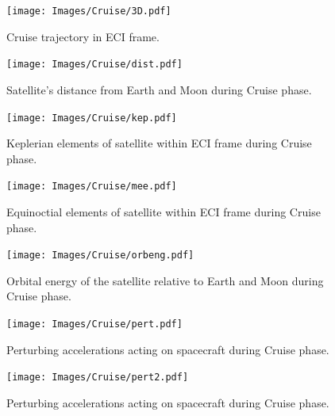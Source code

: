 \begin{figure}
\begin{center}
\texttt{[image: Images/Cruise/3D.pdf]}
\end{center}
\caption{Cruise trajectory in ECI frame.}
\label{fig:Cruise-3D}
\end{figure}

\begin{figure}
\begin{center}
\texttt{[image: Images/Cruise/dist.pdf]}
\end{center}
\caption{Satellite's distance from Earth and Moon during Cruise phase.}
\label{fig:Cruise-dist}
\end{figure}

\begin{figure}
\begin{center}
\texttt{[image: Images/Cruise/kep.pdf]}
\end{center}
\caption{Keplerian elements of satellite within ECI frame during Cruise phase.}
\label{fig:Cruise-kep}
\end{figure}

\begin{figure}
\begin{center}
\texttt{[image: Images/Cruise/mee.pdf]}
\end{center}
\caption{Equinoctial elements of satellite within ECI frame during Cruise phase.}
\label{fig:Cruise-mee}
\end{figure}

\begin{figure}
\begin{center}
\texttt{[image: Images/Cruise/orbeng.pdf]}
\end{center}
\caption{Orbital energy of the satellite relative to Earth and Moon during Cruise phase.}
\label{fig:Cruise-orbeng}
\end{figure}

\begin{figure}
\begin{center}
\texttt{[image: Images/Cruise/pert.pdf]}
\end{center}
\caption{Perturbing accelerations acting on spacecraft during Cruise phase.}
\label{fig:Cruise-pert}
\end{figure}

\begin{figure}
\begin{center}
\texttt{[image: Images/Cruise/pert2.pdf]}
\end{center}
\caption{Perturbing accelerations acting on spacecraft during Cruise phase.}
\label{fig:Cruise-pert2}
\end{figure}

